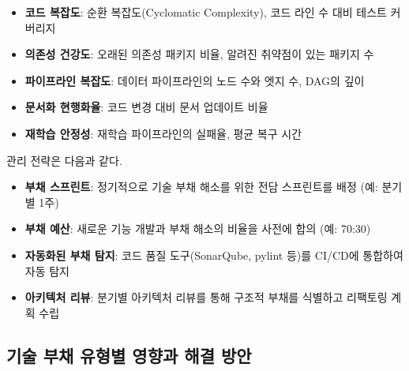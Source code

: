 \begin{itemize}
  \item \textbf{코드 복잡도}: 순환 복잡도(Cyclomatic Complexity), 코드 라인 수 대비 테스트 커버리지
  \item \textbf{의존성 건강도}: 오래된 의존성 패키지 비율, 알려진 취약점이 있는 패키지 수
  \item \textbf{파이프라인 복잡도}: 데이터 파이프라인의 노드 수와 엣지 수, DAG의 깊이
  \item \textbf{문서화 현행화율}: 코드 변경 대비 문서 업데이트 비율
  \item \textbf{재학습 안정성}: 재학습 파이프라인의 실패율, 평균 복구 시간
\end{itemize}

관리 전략은 다음과 같다.
\begin{itemize}
  \item \textbf{부채 스프린트}: 정기적으로 기술 부채 해소를 위한 전담 스프린트를 배정 (예: 분기별 1주)
  \item \textbf{부채 예산}: 새로운 기능 개발과 부채 해소의 비율을 사전에 합의 (예: 70:30)
  \item \textbf{자동화된 부채 탐지}: 코드 품질 도구(SonarQube, pylint 등)를 CI/CD에 통합하여 자동 탐지
  \item \textbf{아키텍처 리뷰}: 분기별 아키텍처 리뷰를 통해 구조적 부채를 식별하고 리팩토링 계획 수립
\end{itemize}

\subsection{기술 부채 유형별 영향과 해결 방안}
\label{sec:10.7.3}

